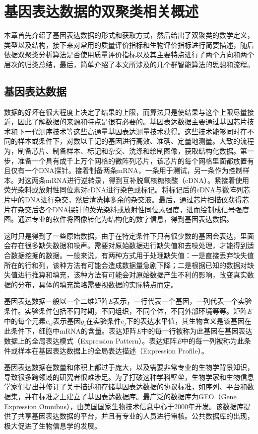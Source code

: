 \chapter{基因表达数据的双聚类相关概述}
本章首先介绍了基因表达数据的形式和获取方式，然后给出了双聚类的数学定义，类型以及结构，接下来对常用的质量评价指标和生物评价指标进行简要描述，随后依据双聚类分析算法是否使用质量评价指标以及其主要特点进行了两个方向和两个层次的归类总结，最后，简单介绍了本文所涉及的几个群智能算法的思想和流程。

\section{基因表达数据}
  数据的好坏在很大程度上决定了结果的上限，而算法只是使结果与这个上限尽量接近，因此了解数据的来源和特点是很有必要的。基因表达数据主要通过基因芯片技术和下一代测序技术等这些高通量基因表达测量技术获得。这些技术能够同时在不同的样本或条件下，对数以千记的基因进行高效、准确、定量地测量。大致的流程为，制备芯片、制备样本、标记和杂交、洗涤和绘制图像，获取结构化数据。第一步，准备一个具有成千上万个网格的微阵列芯片，该芯片的每个网格里面都放置有且仅有一个DNA探针。接着制备两条mRNA，一条用于测试，另一条作为控制样本。对这两条mRNA进行逆转录，得到互补脱氧核糖核酸（cDNA）。紧接着使用荧光染料或放射性同位素对cDNA进行染色或标记。将标记后的cDNA与微阵列芯片中的DNA进行杂交，然后清洗掉多余的杂交液。最后，通过芯片扫描仪获得芯片在杂交后各个DNA探针的荧光染料或放射性同位素强度，进而绘制成信号强度图。通过专业的软件将图像转化为结构化的数字信息，得到基因表达数据。
  
  这时只是得到了一些原始数据，由于在特定条件下只有很少数的基因会表达，里面会存在很多缺失数据和噪声。需要对原始数据进行缺失值和去噪处理，才能得到适合数据挖掘的数据。一般来说，有两种方式用于处理缺失值：一是直接丢弃缺失值所在的行和列，该种方法有可能会造成数据量急剧下降；二是根据已知的数据对缺失值进行推算和填充，该种方法有可能会对原始数据产生不利的影响，改变真实数据的分布，具体的填充策略需要视数据的实际特点而定。

  基因表达数据一般以一个二维矩阵\textit{E}表示，一行代表一个基因，一列代表一个实验条件。实验条件包括不同时期，不同组织，不同个体，不同外部环境等等。矩阵\textit{E}中的每个元素$e_{ij} $表示基因$g_i$在实验条件$c_j$下的表达水平值，其生物含义是该基因在此条件下，细胞中mRNA的含量。表达矩阵\textit{E}中的每一行被称为此基因在基因表达数据上的全局表达模式（Expression Pattern）。表达矩阵\textit{E}中的每一列被称为此条件或样本在基因表达数据上的全局表达描述（Expression Profile）。

  基因表达数据在数量和体积上都过于庞大，以及需要非常专业的生物学背景知识，导致很多跨领域的研究者很难涉足。为了打破这种学科壁垒，生物学家和生物信息学家们提出并修订了关于描述和存储基因表达数据的协议标准，如序列、平台和数据集，并在标准之上建立了基因表达数据库。最广泛的数据库为GEO（Gene Expression Omnibus）\cite{geo}，由美国国家生物技术信息中心于2000年开发。该数据库提供了共享基因表达数据的平台，并且有专业的人员进行审核。公共数据库的出现，极大促进了生物信息学的发展。
